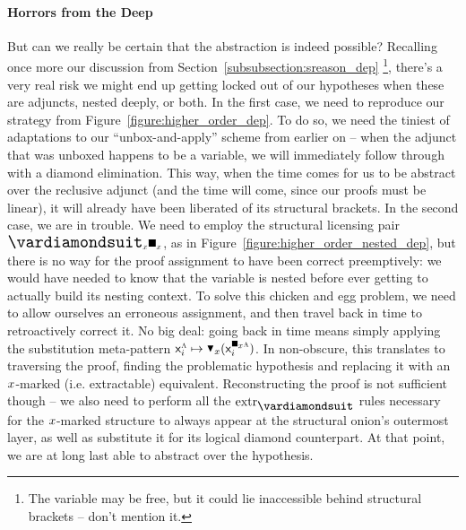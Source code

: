 \paragraph{Horrors from the Deep}
But can we really be certain that the abstraction is indeed possible?
Recalling once more our discussion from Section~\ref{subsubsection:sreason_dep}%
	\footnote{The variable may be free, but it could lie inaccessible behind structural brackets -- don't mention it.},
there's a very real risk we might end up getting locked out of our hypotheses when these are adjuncts, nested deeply, or both.
In the first case, we need to reproduce our strategy from Figure~\ref{figure:higher_order_dep}.
To do so, we need the tiniest of adaptations to our ``unbox-and-apply'' scheme from earlier on -- when the adjunct that was unboxed happens to be a variable, we will immediately follow through with a diamond elimination.
This way, when the time comes for us to be abstract over the reclusive adjunct (and the time will come, since our proofs must be linear), it will already have been liberated of its structural brackets.
In the second case, we are in trouble. 
We need to employ the structural licensing pair $\dxdia{x}\dxbox{x}$, as in Figure~\ref{figure:higher_order_nested_dep}, but there is no way for the proof assignment to have been correct preemptively: we would have needed to know that the variable is nested before ever getting to actually build its nesting context.
To solve this chicken and egg problem, we need to allow ourselves an erroneous assignment, and then travel back in time to retroactively correct it.
No big deal: going back in time means simply applying the substitution meta-pattern $\vari^{\smallgtype{a}} \mapsto \dboxelim{x}(\vari^{\dxbox{x}\smallgtype{a}})$.
In non-obscure, this translates to traversing the proof, finding the problematic hypothesis and replacing it with an $\mathnormal{x}$-marked (i.e. extractable) equivalent.
Reconstructing the proof is not sufficient though -- we also need to perform all the $\Extraction$ rules necessary for the $\mathnormal{x}$-marked structure to always appear at the structural onion's outermost layer, as well as substitute it for its logical diamond counterpart.
At that point, we are at long last able to abstract over the hypothesis.

